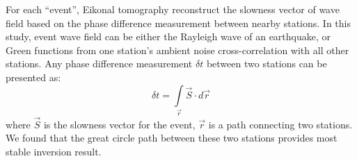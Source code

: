 \documentclass[paperwidth=65in,paperheight=43in,landscape,final,fontscale=0.30]{baposter}
\begin{document}
\begin{poster}
{For each ``event'', Eikonal tomography reconstruct the slowness vector of wave field based on the phase difference measurement between nearby stations. In this study, event wave field can be either the Rayleigh wave of an earthquake, or Green functions from one station's ambient noise cross-correlation with all other stations. Any phase difference measurement $\delta t$ between two stations can be presented as:
\begin{equation}
	\delta t = \int\limits_{\vec{r}} \vec{S} \cdot d\vec{r}
\label{eqn:eikonal}
\end{equation}
where $\vec{S}$ is the slowness vector for the event, $\vec{r}$ is a path connecting two stations. We found that the great circle path between these two stations provides most stable inversion result.
  }
\end{poster}%
%
\end{document}

